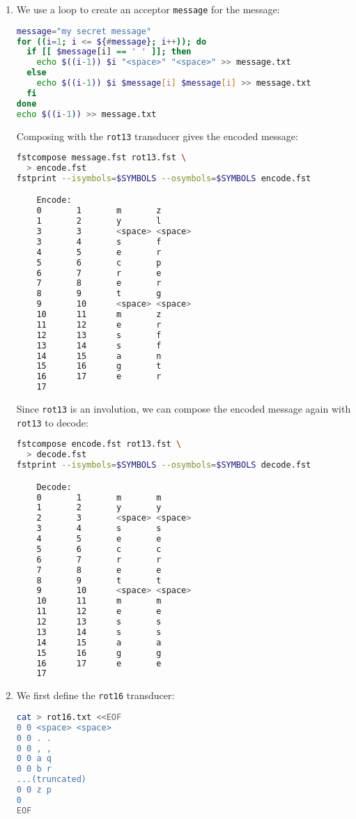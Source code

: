 \documentclass[a4paper,oneside,reqno]{amsart}
\begin{document}
\begin{enumerate}[label=\arabic*.]
\begin{enumerate}[label=(\alph*)]
      \item We use a loop to create an acceptor \texttt{message} for the message:
        \begin{lstlisting}[language=bash]
message="my secret message"
for ((i=1; i <= ${#message}; i++)); do
  if [[ $message[i] == ' ' ]]; then
    echo $((i-1)) $i "<space>" "<space>" >> message.txt
  else
    echo $((i-1)) $i $message[i] $message[i] >> message.txt
  fi
done
echo $((i-1)) >> message.txt
    \end{lstlisting}

    Composing with the \texttt{rot13} transducer gives the encoded message:
    \begin{lstlisting}[language=bash]
fstcompose message.fst rot13.fst \
  > encode.fst
fstprint --isymbols=$SYMBOLS --osymbols=$SYMBOLS encode.fst

    Encode:
    0       1       m       z
    1       2       y       l
    3       3       <space> <space>
    3       4       s       f
    4       5       e       r
    5       6       c       p
    6       7       r       e
    7       8       e       r
    8       9       t       g
    9       10      <space> <space>
    10      11      m       z
    11      12      e       r
    12      13      s       f
    13      14      s       f
    14      15      a       n
    15      16      g       t
    16      17      e       r
    17
    \end{lstlisting}

    Since \texttt{rot13} is an involution, we can compose the encoded
    message again with \texttt{rot13} to decode:
    \begin{lstlisting}[language=bash]
fstcompose encode.fst rot13.fst \
  > decode.fst
fstprint --isymbols=$SYMBOLS --osymbols=$SYMBOLS decode.fst

    Decode:
    0       1       m       m
    1       2       y       y
    2       3       <space> <space>
    3       4       s       s
    4       5       e       e
    5       6       c       c
    6       7       r       r
    7       8       e       e
    8       9       t       t
    9       10      <space> <space>
    10      11      m       m
    11      12      e       e
    12      13      s       s
    13      14      s       s
    14      15      a       a
    15      16      g       g
    16      17      e       e
    17
    \end{lstlisting}

  \item We first define the \texttt{rot16} transducer:
    \begin{lstlisting}[language=bash]
cat > rot16.txt <<EOF
0 0 <space> <space>
0 0 . .
0 0 , ,
0 0 a q
0 0 b r
...(truncated)
0 0 z p
0
EOF
    \end{lstlisting}


\end{enumerate}
\end{enumerate}
\end{document}
